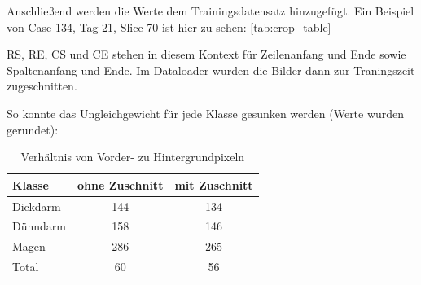 Anschließend werden die Werte dem Trainingsdatensatz hinzugefügt. Ein Beispiel von Case 134, Tag 21, Slice 70 ist hier zu sehen: \autoref{tab:crop_table} 

\begin{table}[H]
 \begin{center}
\caption{Ausschnitt aus der Zuschnitt-Tabelle.}\label{tab:crop_table}
 \end{center}
 \end{table}
 
 RS, RE, CS und CE stehen in diesem Kontext für Zeilenanfang und Ende sowie Spaltenanfang und Ende. Im Dataloader wurden die Bilder dann zur Traningszeit zugeschnitten.
 
 So konnte das Ungleichgewicht für jede Klasse gesunken werden (Werte wurden gerundet): 

\begin{table}[H]
\centering
\begin{tabular}{|l|c|c|}
\hline
Klasse & ohne Zuschnitt & mit Zuschnitt \\ \hline
Dickdarm & 144 & 134\\ \hline
Dünndarm & 158 & 146 \\ \hline
Magen & 286 & 265\\ \hline
Total & 60 & 56\\ \hline
\end{tabular}
\caption{\label{tab:ratio}Verhältnis von Vorder- zu Hintergrundpixeln}
\end{table}

